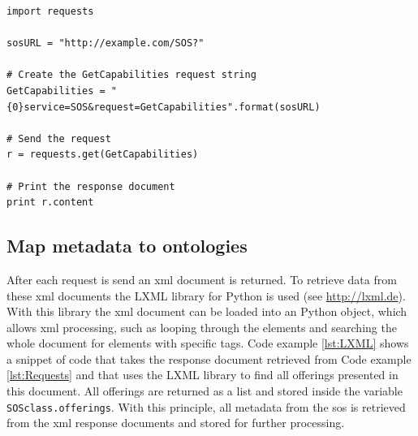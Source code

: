 \begin{lstlisting}[float,caption={Creating a HTTP Get request using Python's Request library}, label={lst:Requests}]
import requests

sosURL = "http://example.com/SOS?"

# Create the GetCapabilities request string
GetCapabilities = "{0}service=SOS&request=GetCapabilities".format(sosURL)

# Send the request
r = requests.get(GetCapabilities)

# Print the response document
print r.content

\end{lstlisting}   


\subsection{Map metadata to ontologies}
After each request is send an \ac{xml} document is returned. To retrieve data from these \ac{xml} documents the LXML library for Python is used (see \url{http://lxml.de}). With this library the \ac{xml} document can be loaded into an Python object, which allows \ac{xml} processing, such as looping through the elements and searching the whole document for elements with specific tags. Code example \ref{lst:LXML} shows a snippet of code that takes the response document retrieved from Code example \ref{lst:Requests} and that uses the LXML library to find all offerings presented in this document. All offerings are returned as a list and stored inside the variable \texttt{SOSclass.offerings}. With this principle, all metadata from the \ac{sos} is retrieved from the \ac{xml} response documents and stored for further processing.    

